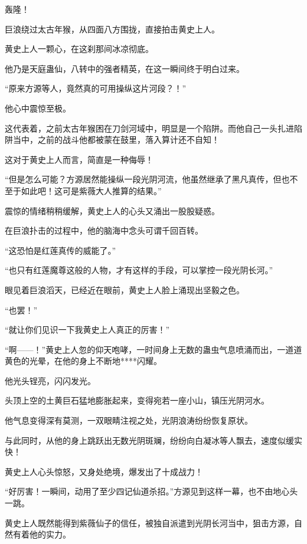 
\begin{this_body}

轰隆！

巨浪绕过太古年猴，从四面八方围拢，直接拍击黄史上人。

黄史上人一颗心，在这刹那间冰凉彻底。

他乃是天庭蛊仙，八转中的强者精英，在这一瞬间终于明白过来。

“原来方源等人，竟然真的可用操纵这片河段？！”

他心中震惊至极。

这代表着，之前太古年猴困在刀剑河域中，明显是一个陷阱。而他自己一头扎进陷阱当中，之前的战斗他都被蒙在鼓里，落入算计还不自知！

这对于黄史上人而言，简直是一种侮辱！

“但是怎么可能？方源居然能操纵一段光阴河流，他虽然继承了黑凡真传，但也不至于如此吧！这可是紫薇大人推算的结果。”

震惊的情绪稍稍缓解，黄史上人的心头又涌出一股股疑惑。

在巨浪扑击的过程中，他的脑海中念头可谓千回百转。

“这恐怕是红莲真传的威能了。”

“也只有红莲魔尊这般的人物，才有这样的手段，可以掌控一段光阴长河。”

眼见着巨浪滔天，已经近在眼前，黄史上人脸上涌现出坚毅之色。

“也罢！”

“就让你们见识一下我黄史上人真正的厉害！”

“啊——！”黄史上人忽的仰天咆哮，一时间身上无数的蛊虫气息喷涌而出，一道道黄色的光晕，在他的身上不断地****闪耀。

他光头锃亮，闪闪发光。

头顶上空的土黄巨石猛地膨胀起来，变得宛若一座小山，镇压光阴河水。

他气息变得深有莫测，一双眼睛注视之处，光阴浪涛纷纷恢复原状。

与此同时，从他的身上跳跃出无数光阴斑斓，纷纷向白凝冰等人飘去，速度似缓实快！

黄史上人心头惊怒，又身处绝境，爆发出了十成战力！

“好厉害！一瞬间，动用了至少四记仙道杀招。”方源见到这样一幕，也不由地心头一跳。

黄史上人既然能得到紫薇仙子的信任，被独自派遣到光阴长河当中，狙击方源，自然有着他的实力。


\end{this_body}
